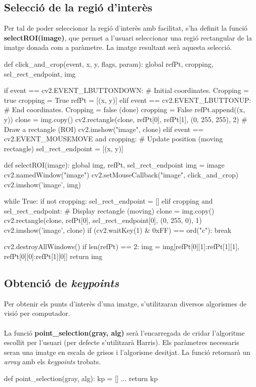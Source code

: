 	\subsection{Selecció de la regió d'interès}
		Per tal de poder seleccionar la regió d'interès amb facilitat, s'ha definit la funció \textbf{selectROI(image)}, que permet a l'usuari seleccionar una regió rectangular de la imatge donada
		com a paràmetre. La imatge resultant serà aquesta selecció.\\
		\begin{python}
def click_and_crop(event, x, y, flags, param):
	global refPt, cropping, sel_rect_endpoint, img
 
	if event == cv2.EVENT_LBUTTONDOWN:	# Initial coordinates. Cropping = true
		cropping = True
		refPt = [(x, y)] 
	elif event == cv2.EVENT_LBUTTONUP:	# End coordinates. Cropping = false (done)
		cropping = False
		refPt.append((x, y)) 
		clone = img.copy()
		cv2.rectangle(clone, refPt[0], refPt[1], (0, 255, 255), 2)	# Draw a rectangle (ROI)
		cv2.imshow("image", clone)
	elif event == cv2.EVENT_MOUSEMOVE and cropping:	# Update position (moving rectangle)
		sel_rect_endpoint = [(x, y)]

def selectROI(image):
	global img, refPt, sel_rect_endpoint
	img = image
	cv2.namedWindow("image")
	cv2.setMouseCallback("image", click_and_crop)
	cv2.imshow('image', img)

	while True:
		if not cropping:
			sel_rect_endpoint = []
		elif cropping and sel_rect_endpoint:	# Display rectangle (moving)
			clone = img.copy()
			cv2.rectangle(clone, refPt[0], sel_rect_endpoint[0], (0, 255, 0), 1)
			cv2.imshow('image', clone)
		if (cv2.waitKey(1) & 0xFF) == ord("c"):
			break

	cv2.destroyAllWindows()
	if len(refPt) == 2:
		img = img[refPt[0][1]:refPt[1][1], refPt[0][0]:refPt[1][0]]
	return img
		\end{python}
	\subsection{Obtenció de \textit{keypoints}}
		Per obtenir els punts d'interès d'una imatge, s'utilitzaran diversos algorismes de visió per computador.\\\\
		La funció \textbf{point{\_}selection(gray, alg)} serà l'encarregada de cridar l'algoritme escollit per l'usuari (per defecte s'utilitzarà Harris).
		Els paràmetres necessaris seran una imatge en escala de grisos i l'algorisme desitjat. La funció retornarà un \textit{array} amb els \textit{keypoints} trobats. \\
		\begin{python}
def point_selection(gray, alg):
	kp = []
	...
	return kp
		\end{python}

